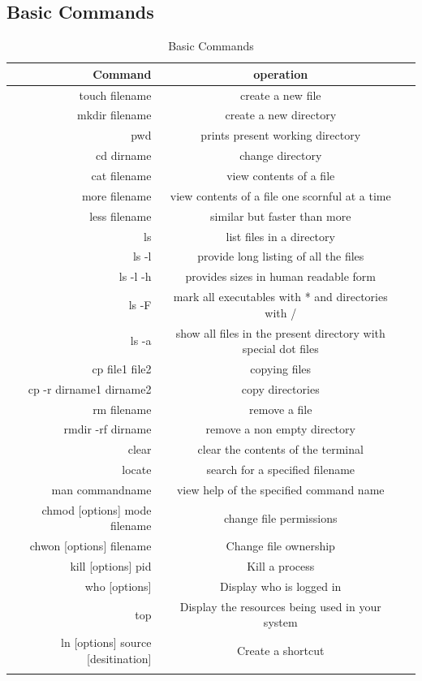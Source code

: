 \documentclass{article}
\begin{document}
\subsection{Basic Commands}
\begin{table}[htb]
\caption{Basic Commands}

\label{Basic commands in Linux}
\begin{tabular}{rcc}
\noalign{\smallskip} \hline \hline \noalign{\smallskip}
Command & operation \\

\hline
touch filename        	& create a new file\\
mkdir filename			&create a new directory\\
pwd						&prints present working directory\\
cd dirname				&change directory\\
\hline
cat filename	&view contents of a file\\
more filename	&view contents of a file one scornful at a time\\
less filename 	&similar but faster than more\\
\hline
ls				&list files in a directory\\
ls -l 			&provide long listing of all the files\\
ls -l -h		&provides sizes in human readable form\\
ls -F			&mark all executables with * and directories with / \\
ls -a			&show all files in the present directory with special dot files\\
\hline
cp file1 file2			&copying files\\
cp -r dirname1 dirname2	&copy directories\\
\hline
rm filename			&remove a file\\
rmdir -rf dirname	&remove a non empty directory\\
\hline
clear			&clear the contents of the terminal\\
locate			&search for a specified filename\\
man commandname	&view help of the specified command name\\
\hline
chmod [options] mode filename &change file permissions\\
chwon [options] filename &Change file ownership\\
kill [options] pid &Kill a process\\
who [options] &Display who is logged in\\
top &Display the resources being used in your system\\
ln [options] source [desitination] &Create a shortcut\\
\noalign{\smallskip} \hline \noalign{\smallskip}
\end{tabular}
\end{table}
\end{document}
